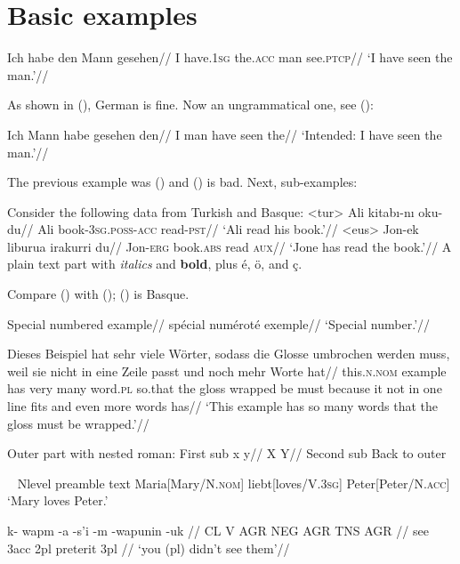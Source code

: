\documentclass{article}
\begin{document}
\section{Basic examples}

\begingl
\gla Ich habe den Mann gesehen//
\glb I have.\textsc{1sg} the.\textsc{acc} man see.\textsc{ptcp}//
\glft `I have seen the man.'//
\endgl
\xe

As shown in (), German is fine. Now an ungrammatical one, see (\nextx):

\ex
\ljudge{*}\begingl
\gla Ich Mann habe gesehen den//
\glb I man have seen the//
\glft `Intended: I have seen the man.'//
\endgl
\xe

The previous example was (\lastx) and (\lastx{}) is bad. Next, sub-examples:

Consider the following data from Turkish and Basque:
\a<tur> \begingl
\gla Ali kitab{\i}-n{\i} oku-du//
\glb Ali book-\textsc{3sg.poss-acc} read-\textsc{pst}//
\glft `Ali read his book.'//
\endgl
\a<eus> \begingl
\gla Jon-ek liburua irakurri du//
\glb Jon-\textsc{erg} book.\textsc{abs} read \textsc{aux}//
\glft `Jone has read the book.'//
\endgl
\a A plain text part with \textit{italics} and \textbf{bold}, plus \'{e}, \"o, and \c{c}.
\xe

Compare () with (); () is Basque.

\ex[exno=12a]
\begingl
\gla Special numbered example//
\glb spécial numéroté exemple//
\glft `Special number.'//
\endgl
\xe

\ex
\begingl
\gla Dieses Beispiel hat sehr viele W\"orter, sodass die Glosse umbrochen werden muss, weil sie nicht in eine Zeile passt und noch mehr Worte hat//
\glb this.\textsc{n.nom} example has very many word.\textsc{pl} so.that the gloss wrapped be must because it not in one line fits and even more words has//
\glft `This example has so many words that the gloss must be wrapped.'//
\endgl
\xe

\pex[labeltype=alpha]
\a Outer part with nested roman:
\pex[labeltype=roman]
\a First sub \begingl
\gla x y//
\glb X Y//
\endgl
\a Second sub
\xe
\a Back to outer
\xe

\ex~
\begingl[glstyle=nlevel]
\glpreamble Nlevel preamble text\endpreamble
Maria[Mary/N.\textsc{nom}] liebt[loves/V.\textsc{3sg}] Peter[Peter/N.\textsc{acc}]
\glft `Mary loves Peter.'
\endgl
\xe

\ex
\begingl
\gla k- wapm -a -s’i -m -wapunin -uk //
\glb CL V AGR NEG AGR TNS AGR //
 see {\sc 3acc} {} {\sc 2pl} preterit {\sc 3pl} //
\glft ‘you (pl) didn’t see them’//
\endgl
\xe
\end{document}
